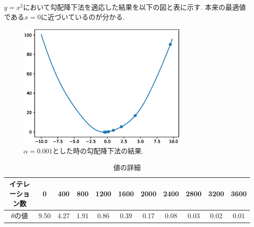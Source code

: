 \begin{Ex}[2次関数における勾配降下法]
    $y = x^2$において勾配降下法を適応した結果を以下の図と表に示す.
    本来の最適値である$x = 0$に近づいているのが分かる.
    \begin{figure}[H]
        \centering
        \includegraphics[width = 8.5cm]{Images/Gradient_Decent.eps}
        \caption{$\alpha = 0.001$とした時の勾配降下法の結果.}
    \end{figure}
    \begin{table}[H]
        \centering
        \begin{tabular}{|c|c|c|c|c|c|c|c|c|c|c|}\hline
            イテレーション数 & 0 & 400 & 800 & 1200 & 1600 & 2000 & 2400 & 2800 & 3200 & 3600\\\hline
            $\theta$の値 & 9.50 & 4.27 & 1.91 & 0.86 & 0.39 & 0.17 & 0.08 & 0.03 & 0.02 & 0.01\\\hline
        \end{tabular}
        \caption{値の詳細}
    \end{table}
\end{Ex}
